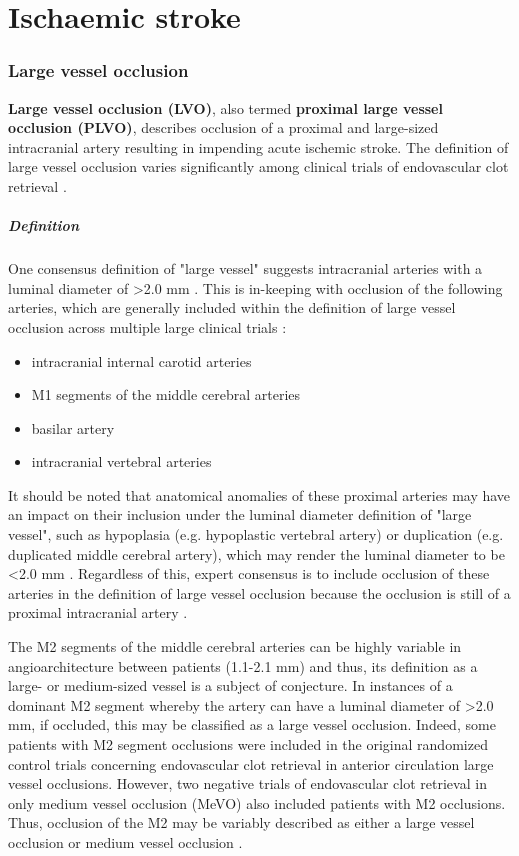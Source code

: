 \chapter{Ischaemic stroke}

\subsection{Large vessel occlusion}

\textbf{Large vessel occlusion (LVO)}, also termed \textbf{proximal large vessel occlusion (PLVO)}, describes occlusion of a proximal and large-sized intracranial artery resulting in impending acute ischemic stroke. The definition of large vessel occlusion varies significantly among clinical trials of endovascular clot retrieval .

\paragraph{Definition}

One consensus definition of "large vessel" suggests intracranial arteries with a luminal diameter of \textgreater2.0 mm . This is in-keeping with occlusion of the following arteries, which are generally included within the definition of large vessel occlusion across multiple large clinical trials :

\begin{itemize}
	\item
	intracranial internal carotid arteries
	\item
	M1 segments of the middle cerebral arteries
	\item
	basilar artery
	\item
	intracranial vertebral arteries
\end{itemize}

It should be noted that anatomical anomalies of these proximal arteries may have an impact on their inclusion under the luminal diameter definition of "large vessel", such as hypoplasia (e.g. hypoplastic vertebral artery) or duplication (e.g. duplicated middle cerebral artery), which may render the luminal diameter to be \textless2.0 mm . Regardless of this, expert consensus is to include occlusion of these arteries in the definition of large vessel occlusion because the occlusion is still of a proximal intracranial artery .

The M2 segments of the middle cerebral arteries can be highly variable in angioarchitecture between patients (1.1-2.1 mm) and thus, its definition as a large- or medium-sized vessel is a subject of conjecture. In instances of a dominant M2 segment whereby the artery can have a luminal diameter of \textgreater2.0 mm, if occluded, this may be classified as a large vessel occlusion. Indeed, some patients with M2 segment occlusions were included in the original randomized control trials concerning endovascular clot retrieval in anterior circulation large vessel occlusions. However, two negative trials of endovascular clot retrieval in only medium vessel occlusion (MeVO) also included patients with M2 occlusions. Thus, occlusion of the M2 may be variably described as either a large vessel occlusion or medium vessel occlusion .

